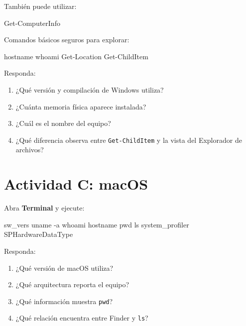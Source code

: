 \documentclass[
  spanish,
  letterpaper,
]{scrbook}
\newenvironment{Shaded}{\begin{snugshade}}{\end{snugshade}}
\newcommand{\AttributeTok}[1]{\textcolor[rgb]{0.40,0.45,0.13}{#1}}
\newcommand{\BuiltInTok}[1]{\textcolor[rgb]{0.00,0.23,0.31}{#1}}
\newcommand{\ExtensionTok}[1]{\textcolor[rgb]{0.00,0.23,0.31}{#1}}
\newcommand{\FunctionTok}[1]{\textcolor[rgb]{0.28,0.35,0.67}{#1}}
\newcommand{\NormalTok}[1]{\textcolor[rgb]{0.00,0.23,0.31}{#1}}
\providecommand{\tightlist}{%
  \setlength{\itemsep}{0pt}\setlength{\parskip}{0pt}}
\begin{document}
También puede utilizar:

\begin{Shaded}
\begin{Highlighting}[]
\NormalTok{Get{-}ComputerInfo}
\end{Highlighting}
\end{Shaded}

Comandos básicos seguros para explorar:

\begin{Shaded}
\begin{Highlighting}[]
\NormalTok{hostname}
\NormalTok{whoami}
\FunctionTok{Get{-}Location}
\FunctionTok{Get{-}ChildItem}
\end{Highlighting}
\end{Shaded}

Responda:

\begin{enumerate}
\def\labelenumi{\arabic{enumi}.}
\tightlist
\item
  ¿Qué versión y compilación de Windows utiliza?
\item
  ¿Cuánta memoria física aparece instalada?
\item
  ¿Cuál es el nombre del equipo?
\item
  ¿Qué diferencia observa entre \texttt{Get-ChildItem} y la vista del
  Explorador de archivos?
\end{enumerate}

\section{Actividad C: macOS}\label{actividad-c-macos}

Abra \textbf{Terminal} y ejecute:

\begin{Shaded}
\begin{Highlighting}[]
\ExtensionTok{sw\_vers}
\FunctionTok{uname} \AttributeTok{{-}a}
\FunctionTok{whoami}
\FunctionTok{hostname}
\BuiltInTok{pwd}
\FunctionTok{ls}
\ExtensionTok{system\_profiler}\NormalTok{ SPHardwareDataType}
\end{Highlighting}
\end{Shaded}

Responda:

\begin{enumerate}
\def\labelenumi{\arabic{enumi}.}
\tightlist
\item
  ¿Qué versión de macOS utiliza?
\item
  ¿Qué arquitectura reporta el equipo?
\item
  ¿Qué información muestra \texttt{pwd}?
\item
  ¿Qué relación encuentra entre Finder y \texttt{ls}?
\end{enumerate}
\end{document}
